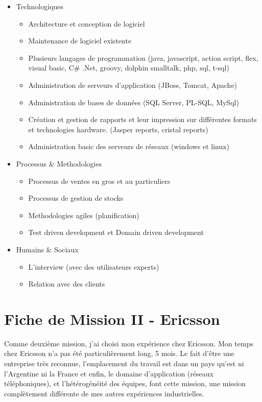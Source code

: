 \documentclass{resume} %
\begin{document}
	\begin{itemize} 				
			\item Technologiques 
					\begin{itemize}
						\item Architecture et conception de logiciel 
						\item Maintenance de logiciel existente
						\item Plusieurs langages de programmation (java, javascript, action script, flex, visual basic, C\# .Net, groovy, dolphin smalltalk, php, sql, t-sql)
						\item Administration de serveurs d'application (JBoss, Tomcat, Apache)
						\item Administration de bases de données (SQL Server, PL-SQL, MySql)
						\item Création et gestion de rapports et leur impression sur différentes formats et technologies hardware. (Jasper reports, cristal reports)
						\item Administration basic des serveurs de réseaux (windows et linux)
					\end {itemize}
			\item Processus \& Methodologies 
					\begin{itemize}
						\item Processus de ventes en gros et au particuliers 
						\item Processus de gestion de stocks 
						\item Methodologies agiles (planification) 
						\item Test driven development et Domain driven development
					\end {itemize}
			\item  Humains \& Sociaux  
				\begin{itemize}
						\item L'interview (avec des utilisateurs experts)
						\item Relation avec des clients
					\end {itemize}

		\end{itemize}
		




\section{Fiche de Mission II - Ericsson }
Comme deuxième mission, j'ai choisi mon expérience chez Ericsson.
Mon temps chez Ericsson n'a pas été particulièrement long, 5 mois. Le fait d'être une entreprise tr\`es reconnue,  l'emplacement du travail est dans un pays qu'est ni l'Argentine ni la France et enfin,  le domaine d'application (réseaux téléphoniques), et l'hétérogénéité des équipes, font cette mission, une mission complètement différente de mes autres expériences industrielles.
\end{document}
